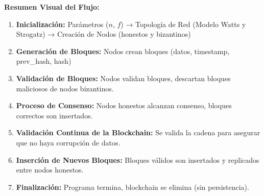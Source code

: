 {{    \vspace{0.5cm}

    \textbf{Resumen Visual del Flujo:}
    \begin{enumerate}
        \item \textbf{Inicialización:} Parámetros ($n$, $f$) → Topología de Red (Modelo Watts y Strogatz) → Creación de Nodos (honestos y bizantinos)
        \item \textbf{Generación de Bloques:} Nodos crean bloques (datos, timestamp, prev\_hash, hash)
        \item \textbf{Validación de Bloques:} Nodos validan bloques, descartan bloques maliciosos de nodos bizantinos.
        \item \textbf{Proceso de Consenso:} Nodos honestos alcanzan consenso, bloques correctos son insertados.
        \item \textbf{Validación Continua de la Blockchain:} Se valida la cadena para asegurar que no haya corrupción de datos.
        \item \textbf{Inserción de Nuevos Bloques:} Bloques válidos son insertados y replicados entre nodos honestos.
        \item \textbf{Finalización:} Programa termina, blockchain se elimina (sin persistencia).
    \end{enumerate}
}}